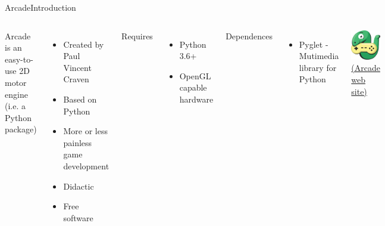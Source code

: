 \documentclass[10pt,compress]{beamer} %
\begin{document}
\begin{frame}{Arcade}{Introduction}
	\begin{columns}
		Arcade is an easy-to-use 2D motor engine (i.e. a Python package)
            \begin{itemize}
		\item Created by Paul Vincent Craven
                \item Based on Python
                \item More or less painless game development
                \item Didactic
                \item Free software
            \end{itemize}

        	Requires
            \begin{itemize}
                \item Python 3.6+
                \item OpenGL capable hardware
            \end{itemize}

            Dependences
            \begin{itemize}
                \item Pyglet - Mutimedia library for Python
            \end{itemize}

            \includegraphics[width=\linewidth]{figs/arcade-logo}\\
    		\href{http://arcade.academy}{(Arcade web site)}
	\end{columns}
\end{frame}
\end{document}
